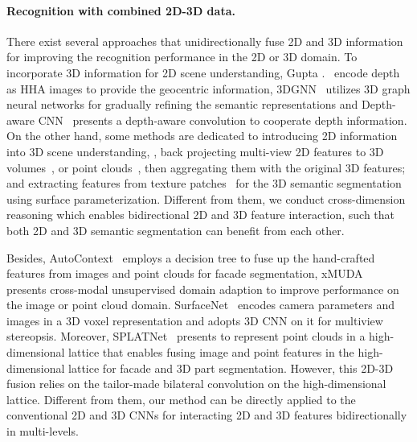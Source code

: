 \documentclass[final]{cvpr}
\begin{document}
\vspace{-4mm}
\paragraph{Recognition with combined 2D-3D data.}
\label{subsec:2d-3d_semseg}

There exist several approaches that unidirectionally fuse 2D and 3D information for improving the recognition performance in the 2D or 3D domain. 
To incorporate 3D information for 2D scene understanding, Gupta \etal.~\cite{gupta2014learning} encode depth as HHA images to provide the geocentric information,
3DGNN~\cite{qi20173d} utilizes 3D graph neural networks for gradually refining the semantic representations and Depth-aware CNN~\cite{wang2018depth} presents a depth-aware convolution to cooperate depth information. 
On the other hand, some methods are dedicated to introducing 2D information into 3D scene understanding,
\eg, back projecting multi-view 2D features to 3D volumes~\cite{dai20183dmv}, or point clouds~\cite{jaritz2019multi}, then aggregating them with the original 3D features;
and extracting features from texture patches~\cite{huang2019texturenet} for the 3D semantic segmentation using surface parameterization.
Different from them, we conduct cross-dimension reasoning which enables bidirectional 2D and 3D feature interaction, such that both 2D and 3D semantic segmentation can benefit from each other.


Besides, 
AutoContext~\cite{gadde2017efficient} employs a decision tree to fuse up the hand-crafted features from images and point clouds for facade segmentation, 
xMUDA~\cite{jaritz2020xmuda} presents cross-modal unsupervised domain adaption to improve performance on the image or point cloud domain.
SurfaceNet~\cite{ji2017surfacenet} encodes camera parameters and images in a 3D voxel representation and adopts 3D CNN on it for multiview stereopsis.
Moreover, SPLATNet~\cite{su2018splatnet} presents to represent point clouds in a high-dimensional lattice that enables fusing image and point features in the high-dimensional lattice for facade and 3D part segmentation. 
However, this 2D-3D fusion relies on the tailor-made bilateral convolution on the high-dimensional lattice. 
Different from them, our method can be directly applied to the conventional 2D and 3D CNNs for interacting 2D and 3D features bidirectionally in multi-levels.
\end{document}
